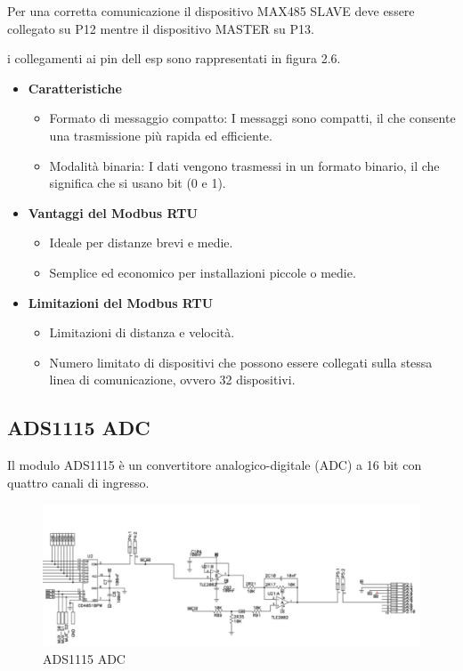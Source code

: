 \documentclass[12pt,a4paper]{report}
\begin{document}
Per una corretta comunicazione il dispositivo MAX485 SLAVE deve essere collegato su P12 mentre il dispositivo MASTER su P13.

i collegamenti ai pin dell esp sono rappresentati in figura 2.6.

\begin{itemize}
    \item \textbf{Caratteristiche}
    \begin{itemize}
        \item Formato di messaggio compatto: I messaggi sono compatti, il che consente una trasmissione più rapida ed efficiente.
        \item Modalità binaria: I dati vengono trasmessi in un formato binario, il che significa che si usano bit (0 e 1).
    \end{itemize}
    \item \textbf{Vantaggi del Modbus RTU}
    \begin{itemize}
        \item Ideale per distanze brevi e medie.
        \item Semplice ed economico per installazioni piccole o medie.
    \end{itemize}
    \item \textbf{Limitazioni del Modbus RTU}
    \begin{itemize}
        \item Limitazioni di distanza e velocità.
        \item Numero limitato di dispositivi che possono essere collegati sulla stessa linea di comunicazione, ovvero 32 dispositivi.
    \end{itemize}
\end{itemize}

\newpage

\subsection{ADS1115 ADC}
Il modulo ADS1115 è un convertitore analogico-digitale (ADC) a 16 bit con quattro canali di ingresso.

\begin{figure}[H]
    \centering
    \includegraphics[width=\linewidth]{../image/ADC.png}
    \caption{ADS1115 ADC}
\end{figure}
\end{document}

